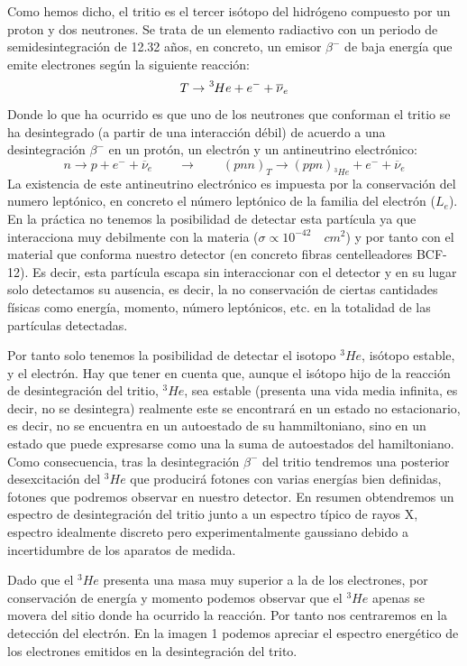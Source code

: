 Como hemos dicho, el tritio es el tercer isótopo del hidrógeno compuesto por un proton y dos neutrones. Se trata de un elemento radiactivo con un periodo de semidesintegración de 12.32 años, en concreto, un emisor $\beta^-$ de baja energía que emite electrones según la siguiente reacción:
$$T \rightarrow \ce{^{3}{He}} + e^- + \overline{\nu}_e$$
Donde lo que ha ocurrido es que uno de los neutrones que conforman el tritio se ha desintegrado (a partir de una interacción débil) de acuerdo a una desintegración $\beta^-$ en un protón, un electrón y un antineutrino electrónico:
$$n \rightarrow p + e^- + \overline{\nu}_e \qquad \rightarrow \qquad (pnn)_T\rightarrow (ppn)_{^3He} + e^- + \overline{\nu}_e $$
La existencia de este antineutrino electrónico es impuesta por la conservación del numero leptónico, en concreto el número leptónico de la familia del electrón ($L_e$). En la práctica no tenemos la posibilidad de detectar esta partícula ya que interacciona muy debilmente con la materia ($\sigma \propto 10^{-42} \quad cm^2$) y por tanto con el material que conforma nuestro detector (en concreto fibras centelleadores BCF-12). Es decir, esta partícula escapa sin interaccionar con el detector y en su lugar solo detectamos su ausencia, es decir, la no conservación de ciertas cantidades físicas como energía, momento, número leptónicos, etc. en la totalidad de las partículas detectadas.

Por tanto solo tenemos la posibilidad de detectar el isotopo $^3He$, isótopo estable, y el electrón. Hay que tener en cuenta que, aunque el isótopo hijo de la reacción de desintegración del tritio, $^3He$, sea estable (presenta una vida media infinita, es decir, no se desintegra) realmente este se encontrará en un estado no estacionario, es decir, no se encuentra en un autoestado de su hammiltoniano, sino en un estado que puede expresarse como una la suma de autoestados del hamiltoniano. Como consecuencia, tras la desintegración $\beta^-$ del tritio tendremos una posterior desexcitación del $^3He$ que producirá fotones con varias energías bien definidas, fotones que podremos observar en nuestro detector. En resumen obtendremos un espectro de desintegración del tritio junto a un espectro típico de rayos X, espectro idealmente discreto pero experimentalmente gaussiano debido a incertidumbre de los aparatos de medida.

Dado que el $^3He$ presenta una masa muy superior a la de los electrones, por conservación de energía y momento podemos observar que el $^3He$ apenas se movera del sitio donde ha ocurrido la reacción. Por tanto nos centraremos en la detección del electrón. En la imagen 1 podemos apreciar el espectro energético de los electrones emitidos en la desintegración del trito.

